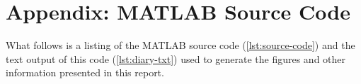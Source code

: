 \documentclass{ajhlabreport}
\begin{document}
\newpage
\chapter{Appendix: MATLAB Source Code}

What follows is a listing of the MATLAB source code (\autoref{lst:source-code})
and the text output of this code (\autoref{lst:diary-txt}) used to generate the
figures and other information presented in this report.



\end{document}
